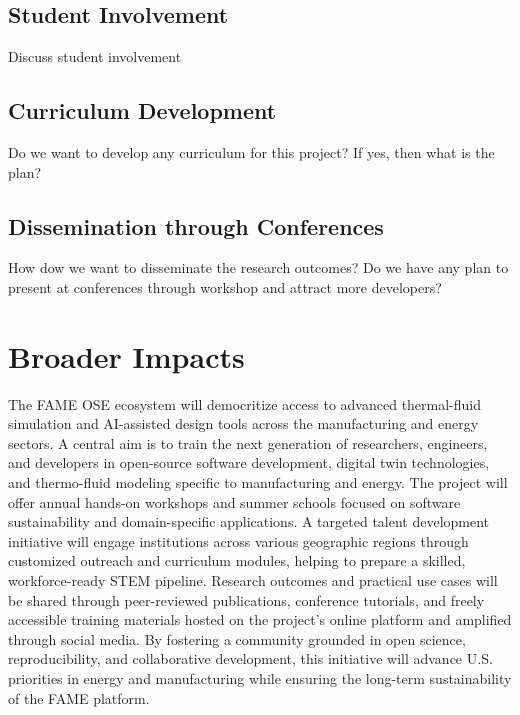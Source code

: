 \documentclass[11pt]{article}
\begin{document}
\subsection{Student Involvement}  
Discuss student involvement

\subsection{Curriculum Development}  
Do we want to develop any curriculum for this project? If yes, then what is the plan?

\subsection{Dissemination through Conferences}  
How dow we want to disseminate the research outcomes? Do we have any plan to present at conferences through workshop and attract more developers?

\section{Broader Impacts}
The FAME OSE ecosystem will democritize access to advanced thermal-fluid simulation and AI-assisted design tools across the manufacturing and energy sectors. A central aim is to train the next generation of researchers, engineers, and developers in open-source software development, digital twin technologies, and thermo-fluid modeling specific to manufacturing and energy. The project will offer annual hands-on workshops and summer schools focused on software sustainability and domain-specific applications. A targeted talent development initiative will engage institutions across various geographic regions through customized outreach and curriculum modules, helping to prepare a skilled, workforce-ready STEM pipeline. Research outcomes and practical use cases will be shared through peer-reviewed publications, conference tutorials, and freely accessible training materials hosted on the project's online platform and amplified through social media. By fostering a community grounded in open science, reproducibility, and collaborative development, this initiative will advance U.S. priorities in energy and manufacturing while ensuring the long-term sustainability of the FAME platform.
\end{document}
